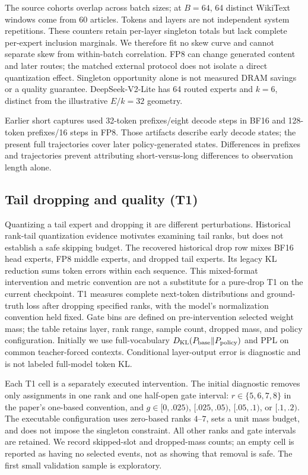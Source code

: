 \documentclass[10pt,twocolumn]{article}
\begin{document}
The source cohorts overlap across batch sizes; at $B=64$, 64 distinct WikiText windows come from 60 articles. Tokens and layers are not independent system repetitions. These counters retain per-layer singleton totals but lack complete per-expert inclusion marginals. We therefore fit no skew curve and cannot separate skew from within-batch correlation. FP8 can change generated content and later routes; the matched external protocol does not isolate a direct quantization effect. Singleton opportunity alone is not measured DRAM savings or a quality guarantee. DeepSeek-V2-Lite has 64 routed experts and $k=6$, distinct from the illustrative $E/k=32$ geometry.

Earlier short captures used 32-token prefixes/eight decode steps in BF16 and 128-token prefixes/16 steps in FP8. Those artifacts describe early decode states; the present full trajectories cover later policy-generated states. Differences in prefixes and trajectories prevent attributing short-versus-long differences to observation length alone.

\subsection{Tail dropping and quality (T1)}
Quantizing a tail expert and dropping it are different perturbations. Historical rank-tail quantization evidence motivates examining tail ranks, but does not establish a safe skipping budget. The recovered historical drop row mixes BF16 head experts, FP8 middle experts, and dropped tail experts. Its legacy KL reduction sums token errors within each sequence. This mixed-format intervention and metric convention are not a substitute for a pure-drop T1 on the current checkpoint. T1 measures complete next-token distributions and ground-truth loss after dropping specified ranks, with the model's normalization convention held fixed. Gate bins are defined on pre-intervention selected weight mass; the table retains layer, rank range, sample count, dropped mass, and policy configuration. Initially we use full-vocabulary $D_{\rm KL}(P_{\rm base}\Vert P_{\rm policy})$ and PPL on common teacher-forced contexts. Conditional layer-output error is diagnostic and is not labeled full-model token KL.

Each T1 cell is a separately executed intervention. The initial diagnostic removes only assignments in one rank and one half-open gate interval: $r\in\{5,6,7,8\}$ in the paper's one-based convention, and $g\in[0,.025)$, $[.025,.05)$, $[.05,.1)$, or $[.1,.2)$. The executable configuration uses zero-based ranks $4$--$7$, sets a unit mass budget, and does not impose the singleton constraint. All other ranks and gate intervals are retained. We record skipped-slot and dropped-mass counts; an empty cell is reported as having no selected events, not as showing that removal is safe. The first small validation sample is exploratory.
\end{document}
